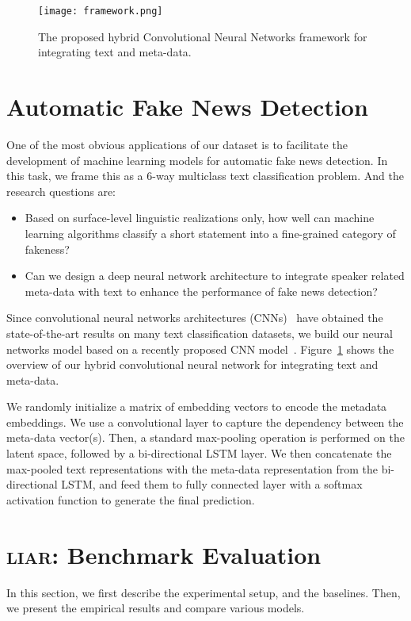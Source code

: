 \documentclass[11pt,a4paper]{article}
\begin{document}
\begin{figure}[t]
\centering
\texttt{[image: framework.png]}
\caption{The proposed hybrid Convolutional Neural Networks framework for integrating text and meta-data.}
\label{fig:cnn}
\end{figure}

\section{Automatic Fake News Detection}
One of the most obvious applications of our dataset is to facilitate the development of machine learning models for automatic fake news detection. In this task, we frame this as a 6-way multiclass text classification problem. And the research questions are: 
\begin{itemize}
\item Based on surface-level linguistic realizations only, how well can machine learning algorithms classify a short statement into a fine-grained category of fakeness?
\item Can we design a deep neural network architecture to integrate speaker related meta-data with text to enhance the performance of fake news detection?
\end{itemize}

Since convolutional neural networks architectures (CNNs)~\cite{collobert2011natural,kim:2014:EMNLP2014,zhang2015character} have obtained the state-of-the-art results on many text classification datasets, we build our neural networks model based on a recently proposed CNN model~\cite{kim:2014:EMNLP2014}. Figure~\ref{fig:cnn} shows the overview of our hybrid convolutional neural network for integrating text and meta-data. 

We randomly initialize a matrix of embedding vectors to encode the metadata embeddings. We use a convolutional layer to capture the dependency between the meta-data vector(s). Then, a standard max-pooling operation is performed on the latent space, followed by a bi-directional LSTM layer.
We then concatenate the max-pooled text representations with the meta-data representation from the bi-directional LSTM, and feed them to
fully connected layer with a softmax activation function to generate the final prediction.
\section{\textsc{liar}: Benchmark Evaluation}
In this section, we first describe the experimental setup, and the baselines. Then, we present the empirical results and compare various models.
\end{document}
